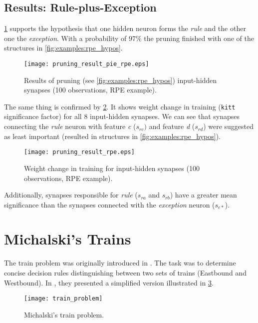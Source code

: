 \subsection*{Results: Rule-plus-Exception}
\cref{fig:examples:pruning_result_pie_rpe} supports the hypothesis that one hidden neuron forms the \textit{rule} and the other one the \textit{exception}. With a probability of $ 97\% $ the pruning finished with one of the structures in \cref{fig:examples:rpe_hypos}.

\begin{figure}[H]
\centering
\texttt{[image: pruning\_result\_pie\_rpe.eps]}
\caption{Results of pruning (see \cref{fig:examples:rpe_hypos}) input-hidden synapses (100 observations, RPE example).}
\label{fig:examples:pruning_result_pie_rpe}
\end{figure}

The same thing is confirmed by \cref{fig:examples:pruning_result_rpe}. It shows weight change in training (\texttt{kitt} significance factor) for all 8 input-hidden synapses. We can see that synapses connecting the \textit{rule} neuron with feature \textit{c} ($ s_{rc}) $ and feature \textit{d} ($ s_{rd} $) were suggested as least important (resulted in structures in \cref{fig:examples:rpe_hypos}).

\begin{figure}[H]
\centering
\texttt{[image: pruning\_result\_rpe.eps]}
\caption{Weight change in training for input-hidden synapses (100 observations, RPE example).}
\label{fig:examples:pruning_result_rpe}
\end{figure}

Additionally, synapses responsible for \textit{rule} ($ s_{ra} $ and $ s_{rb} $) have a greater mean significance than the synapses connected with the \textit{exception} neuron ($ s_{e*} $).

\section{Michalski's Trains} \label{sec:example_trains}
The train problem was originally introduced in \citep{michalski}. The task was to determine concise decision rules distinguishing between two sets of trains (Eastbound and Westbound). In \citep{mozer_smolensky}, they presented a simplified version illustrated in \cref{fig:examples:dataset_train}.

\begin{figure}[H]
\centering
\texttt{[image: train\_problem]}
\caption{Michalski's train problem.}
\label{fig:examples:dataset_train}
\end{figure}

